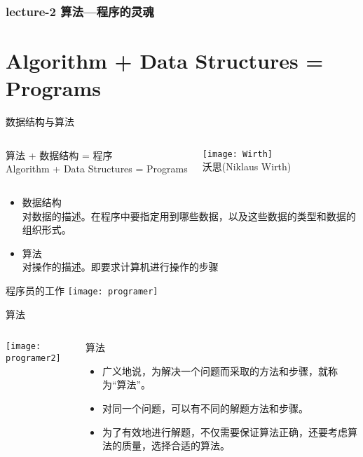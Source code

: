 \begin{frame}
  \frametitle{lecture-2 算法---程序的灵魂}
  \tableofcontents[hideallsubsections]
\end{frame}

\section{Algorithm + Data Structures = Programs}

\begin{frame}{数据结构与算法}
\begin{columns}
	\begin{block}{}
		算法 + 数据结构 = 程序\\
		Algorithm + Data Structures = Programs
	\end{block}
	\texttt{[image: Wirth]}\\
	沃思(Niklaus Wirth)
\end{columns}
\begin{itemize}
	\item 数据结构\\
	对数据的描述。在程序中要指定用到哪些数据，以及这些数据的类型和数据的组织形式。
	\item 	算法\\
	对操作的描述。即要求计算机进行操作的步骤	
\end{itemize}
\end{frame}

\begin{frame}{程序员的工作}
\texttt{[image: programer]}
\end{frame}

\begin{frame}{算法}
\begin{columns}
	\texttt{[image: programer2]}
	\begin{block}{算法}
		\begin{itemize}
			\item 广义地说，为解决一个问题而采取的方法和步骤，就称为“算法”。
		    \item 对同一个问题，可以有不同的解题方法和步骤。
		    \item 为了有效地进行解题，不仅需要保证算法正确，还要考虑算法的质量，选择合适的算法。
		\end{itemize} 
	\end{block}
\end{columns}
\end{frame}

